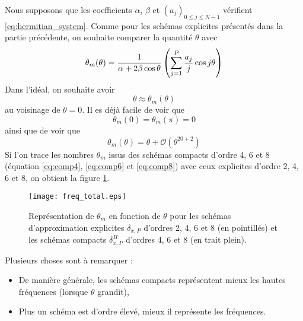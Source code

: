 Nous supposons que les coefficients $\alpha$, $\beta$ et $(a_j)_{0 \leq j \leq N-1}$ vérifient \eqref{eq:hermitian_system}.
Comme pour les schémas explicites présentés dans la partie précédente, on souhaite comparer la quantité $\theta$ avec
\begin{equation}
\theta_m(\theta) = \dfrac{1}{\alpha + 2 \beta \cos \theta} \left( \displaystyle\sum\limits_{j=1}^P \dfrac{a_j}{j} \cos j \theta \right)
\end{equation}
Dans l'idéal, on souhaite avoir 
\begin{equation}
\theta \approx \theta_m(\theta)
\end{equation}
au voisinage de $\theta = 0$. Il es déjà facile de voir que 
\begin{equation}
\theta_m(0) = \theta_m(\pi) = 0
\end{equation}
ainsi que de voir que 
\begin{equation}
\theta_m(\theta) = \theta + \mathcal{O}(\theta^{20+2})
\end{equation}
Si l'on trace les nombres $\theta_m$ issus des schémas compacts d'ordre 4, 6 et 8 (équation \eqref{eq:comp4}, \eqref{eq:comp6} et \eqref{eq:comp8}) avec ceux explicites d'ordre 2, 4, 6 et 8, on obtient la figure \ref{fig:freq_comp}.

\begin{figure}[htbp]
\begin{center}
\texttt{[image: freq\_total.eps]}
\end{center}
\caption{Représentation de $\theta_m$ en fonction de $\theta$ pour les schémas d'approximation explicites $\delta_{x,P}$ d'ordres 2, 4, 6 et 8 (en pointillés) et les schémas compacts $\delta_{x,P}^H$ d'ordres 4, 6 et 8 (en trait plein).}
\label{fig:freq_comp}
\end{figure}

Plusieurs choses sont à remarquer :
\begin{itemize}
\item De manière générale, les schémas compacts représentent mieux les hautes fréquences (lorsque $\theta$ grandit),
\item Plus un schéma est d'ordre élevé, mieux il représente les fréquences.
\end{itemize}

























